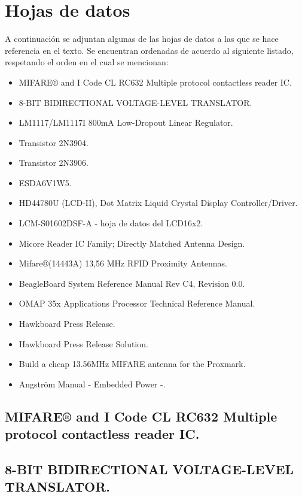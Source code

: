 \chapter{Hojas de datos}\label{HD}

A continuación se adjuntan algunas de las hojas de datos a las que se hace referencia en el texto.
Se encuentran ordenadas de acuerdo al siguiente listado, respetando el orden en el cual se mencionan:

\begin{itemize}
\item MIFARE® and I Code CL RC632 Multiple protocol contactless reader IC.
\item 8-BIT BIDIRECTIONAL VOLTAGE-LEVEL TRANSLATOR.
\item LM1117/LM1117I 800mA Low-Dropout Linear Regulator.
\item Transistor 2N3904.
\item Transistor 2N3906.
\item ESDA6V1W5.
\item HD44780U (LCD-II), Dot Matrix Liquid Crystal Display Controller/Driver.
\item LCM-S01602DSF-A - hoja de datos del LCD16x2.
\item Micore Reader IC Family; Directly Matched Antenna Design.
\item Mifare®(14443A) 13,56 MHz RFID Proximity Antennas.
\item BeagleBoard System Reference Manual Rev C4, Revision 0.0.
\item OMAP 35x Applications Processor Technical Reference Manual.
\item Hawkboard Press Release.
\item Hawkboard Press Release Solution.
\item Build a cheap 13.56MHz MIFARE antenna for the Proxmark.
\item Angström Manual - Embedded Power -.
\end{itemize}

\newpage
\section{MIFARE® and I Code CL RC632 Multiple protocol contactless reader IC.}


\section{8-BIT BIDIRECTIONAL VOLTAGE-LEVEL TRANSLATOR.}


